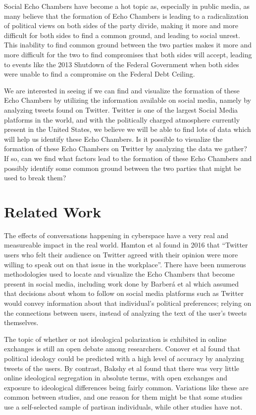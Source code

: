 \documentclass[journal]{IEEEtran}
\begin{document}
Social Echo Chambers have become a hot topic as, especially in public media, as many believe that the formation of Echo Chambers is leading to a radicalization of political views on both sides of the party divide, making it more and more difficult for both sides to find a common ground, and leading to social unrest. This inability to find common ground between the two parties makes it more and more difficult for the two to find compromises that both sides will accept, leading to events like the 2013 Shutdown of the Federal Government when both sides were unable to find a compromise on the Federal Debt Ceiling. 

We are interested in seeing if we can find and visualize the formation of these Echo Chambers by utilizing the information available on social media, namely by analyzing tweets found on Twitter. Twitter is one of the largest Social Media platforms in the world, and with the politically charged atmosphere currently present in the United States, we believe we will be able to find lots of data which will help us identify these Echo Chambers. Is it possible to visualize the formation of these Echo Chambers on Twitter by analyzing the data we gather? If so, can we find what factors lead to the formation of these Echo Chambers and possibly identify some common ground between the two parties that might be used to break them? 

\section{Related Work}

The effects of conversations happening in cyberspace have a very real and measureable impact in the real world. Hamton et al found  in 2016 that “Twitter users who felt their audience on Twitter agreed with their opinion were more willing to speak out on that issue in the workplace”.  There have been numerous methodologies used to locate and visualize the Echo Chambers that become present in social media, including work done by Barberá et al which assumed that decisions about whom to follow on social media platforms such as Twitter would convey information about that individual’s political preferences; relying on the connections between users, instead of analyzing the text of the user's tweets themselves. 

The topic of whether or not ideological polarization is exhibited in online exchanges is still an open debate among researchers. Conover et al found that political ideology could be predicted with a high level of accuracy by analyzing tweets of the users. By contrast, Bakshy et al found that there was very little online ideological segregation in absolute terms, with open exchanges and exposure to ideological differences being fairly common. Variations like these are common between studies, and one reason for them might be that some studies use a self-selected sample of partisan individuals, while other studies have not. 
\end{document}
